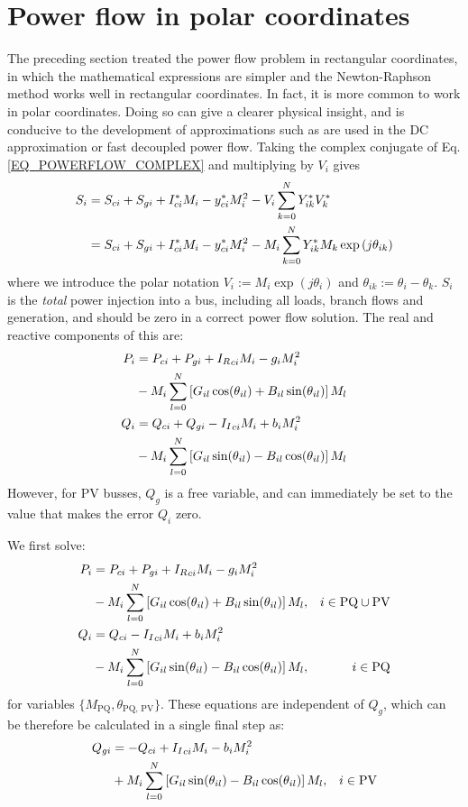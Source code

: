 \documentclass[11pt]{article}
\newcommand{\Ir}{{I_R}}
\newcommand{\Ii}{{I_I}}
\begin{document}
\section{Power flow in polar coordinates}
The preceding section treated the power flow problem in rectangular coordinates, in which the mathematical expressions are simpler and the Newton-Raphson method works well in rectangular coordinates. In fact, it is more common to work in polar coordinates. Doing so can give a clearer physical insight, and is conducive to the development of approximations such as are used in the DC approximation or fast decoupled power flow. Taking the complex conjugate of Eq. \ref{EQ_POWERFLOW_COMPLEX} and multiplying by $V_i$ gives
\newcommand{\M}[1]{\ensuremath{M_{#1}}}
\newcommand{\cs}[1]{\ensuremath{\cos(\theta_{#1})}}
\newcommand{\sn}[1]{\ensuremath{\sin(\theta_{#1})}}
\begin{align}
	S_i &= S_{ci} + S_{gi} + I^*_{ci}M_i - y^*_{ci}\M{i}^2 - V_i\sum_{k = 0}^N{Y^*_{ik}V^*_k} \notag \\
	&= S_{ci} + S_{gi} + I^*_{ci}M_i - y^*_{ci}\M{i}^2 - \M{i}\sum_{k = 0}^N{Y^*_{ik}\M{k}\exp{(j\theta_{ik})}}
\end{align}
where we introduce the polar notation $V_i := M_i \exp{(j\theta_i)}$ and $\theta_{ik} := \theta_i - \theta_k$. $S_i$ is the \emph{total} power injection into a bus, including all loads, branch flows and generation, and should be zero in a correct power flow solution. The real and reactive components of this are:
\begin{align}
	P_i &= P_{ci} + P_{gi} + \Ir_{ci}M_i - g_i\M{i}^2 \notag \\
	&- \M{i}\sum_{l = 0}^N{\left[G_{il}\cs{il} + B_{il}\sn{il}\right]\M{l}} \notag \\
	Q_i &= Q_{ci} + Q_{gi} - \Ii_{ci}M_i + b_i\M{i}^2 \notag \\
	&- \M{i}\sum_{l = 0}^N{\left[G_{il}\sn{il} - B_{il}\cs{il}\right]\M{l}} \notag \\
\end{align}
However, for PV busses, $Q_{g}$ is a free variable, and can immediately be set to the value that makes the error $Q_i$ zero.

We first solve:
\begin{align}
	P_i &= P_{ci} + P_{gi} + \Ir_{ci}M_i - g_i\M{i}^2 \notag \\
	&- \M{i}\sum_{l = 0}^N{\left[G_{il}\cs{il} + B_{il}\sn{il}\right]\M{l}}  , & i \in \mathrm{PQ} \cup \mathrm{PV}\notag \\
	Q_i &= Q_{ci} - \Ii_{ci}M_i + b_i\M{i}^2 \notag \\
	&- \M{i}\sum_{l = 0}^N{\left[G_{il}\sn{il} - B_{il}\cs{il}\right]\M{l}}, & i \in \mathrm{PQ}
\end{align}
for variables $\{M_\text{PQ}, \theta_\text{PQ, PV}\}$. These equations are independent of $Q_g$, which can be therefore be calculated in a single final step as:
\begin{align}
	Q_{gi} &= -Q_{ci} + \Ii_{ci}M_i - b_i\M{i}^2 \notag \\
	&+ \M{i}\sum_{l = 0}^N{\left[G_{il}\sn{il} - B_{il}\cs{il}\right]\M{l}}, & i \in \mathrm{PV}
\end{align}
\end{document}
